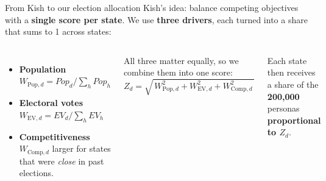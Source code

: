 \documentclass[aspectratio=169,11pt]{beamer}
\begin{document}
	\begin{frame}{From Kish to our election allocation}
		Kish's idea: balance competing objectives with a \textbf{single score per
			state}. We use \textbf{three drivers}, each turned into a share that sums
		to 1 across states:
		\vspace{0.6em}
		
		\begin{columns}[T]
			\begin{itemize}
				\item \textbf{Population} \\
				$W_{\text{Pop},d} = Pop_d \big/ \sum_h Pop_h$
				\item \textbf{Electoral votes} \\
				$W_{\text{EV},d} = EV_d \big/ \sum_h EV_h$
				\item \textbf{Competitiveness} \\
				$W_{\text{Comp},d}$  larger for states that were
				\emph{close} in past elections.
			\end{itemize}
			
			All three matter equally, so we combine them into one score:
			\[
			Z_d = \sqrt{\,W_{\text{Pop},d}^2 + W_{\text{EV},d}^2
				+ W_{\text{Comp},d}^2\,}
			\]
			\vspace{0.2em}
			
			Each state then receives a share of the \textbf{200{,}000} personas
			\textbf{proportional to $Z_d$}.
		\end{columns}
	\end{frame}
	
\end{document}
